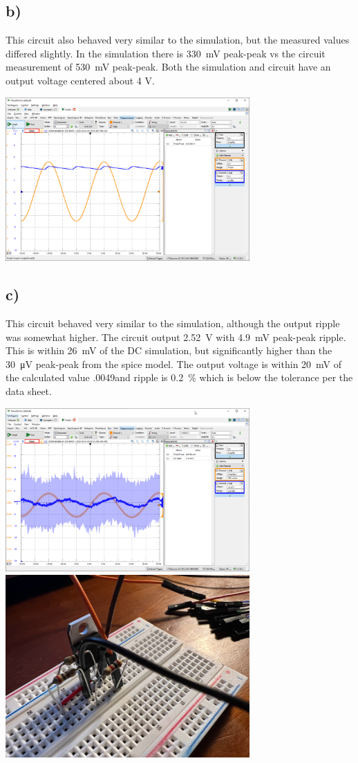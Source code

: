 \documentclass{article}
\begin{document}
	\subsection*{b)}
	
	This circuit also behaved very similar to the simulation, but the measured values differed slightly. In the simulation there is \SI{330}{\mV} peak-peak vs the circuit measurement of \SI{530}{\mV} peak-peak. Both the simulation and circuit have an output voltage centered about 4 V.
	
	\begin{center}
	\includegraphics[width=0.7\textwidth]{fig2b-scope-2}
	\end{center}
	
	\subsection*{c)}
	
	This circuit behaved very similar to the simulation, although the output ripple was somewhat higher. The circuit output \SI{2.52}{\V} with \SI{4.9}{\mV} peak-peak ripple. This is within \SI{26}{\mV} of the DC simulation, but significantly higher than the  \SI{30}{\uV} peak-peak from the spice model. The output voltage is within  \SI{20}{\mV} of the calculated value .0049and ripple is  \SI{0.2}{\percent}  which is below the tolerance per the data sheet. 
	
	\begin{center}
	\includegraphics[width=0.7\textwidth]{fig2c-scope-2}
	\includegraphics[width=0.7\textwidth]{regulator}
	\end{center}
	
	
\end{document}

